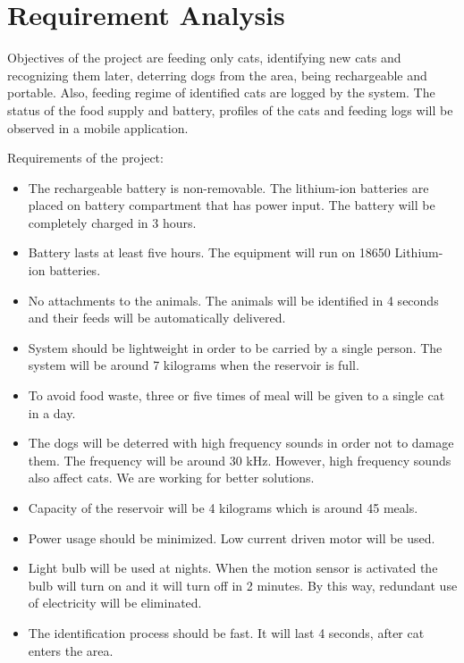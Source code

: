 \section{Requirement Analysis} \label{sec:req_anal}

% 

Objectives of the project are feeding only cats, identifying new cats and recognizing them later, deterring dogs from the area, being rechargeable and portable. Also, feeding regime of identified cats are logged by the system.
The status of the food supply and battery, profiles of the cats and feeding logs will be observed in a mobile application.

Requirements of the project:
\begin{itemize}
\item The rechargeable battery is non-removable. The lithium-ion batteries are placed on battery compartment that has power input. The battery will be completely charged in 3 hours.
\item Battery lasts at least five hours. The equipment will run on 18650 Lithium-ion batteries.
\item No attachments to the animals. The animals will be identified in 4 seconds and their feeds will be automatically delivered. 
\item System should be lightweight in order to be carried by a single person. The system will be around 7 kilograms when the reservoir is full. %
\item To avoid food waste, three or five times of meal will be given to a single cat in a day.
\item The dogs will be deterred with high frequency sounds in order not to damage them. The frequency will be around 30 kHz. However, high frequency sounds also affect cats. We are working for better solutions.
\item Capacity of the reservoir will be 4 kilograms which is around 45 meals.
\item Power usage should be minimized. Low current driven motor will be used.
\item Light bulb will be used at nights. When the motion sensor is activated the bulb will turn on and it will turn off in 2 minutes. By this way, redundant use of electricity will be eliminated.
\item The identification process should be fast. It will last 4 seconds, after cat enters the area. %
\end{itemize}